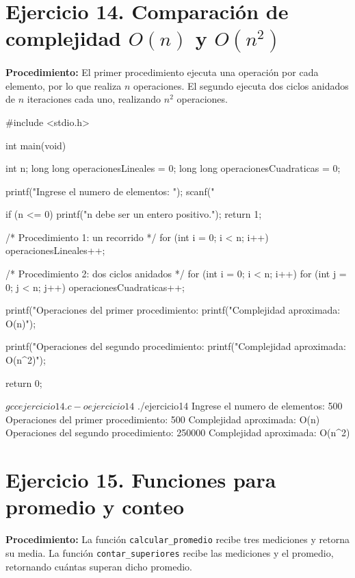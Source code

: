 \documentclass[11pt, a4paper]{article}
\begin{document}
\newpage

\section*{Ejercicio 14. Comparación de complejidad \texorpdfstring{$O(n)$}{O(n)} y \texorpdfstring{$O(n^2)$}{O(n^2)}}
\textbf{Procedimiento:} El primer procedimiento ejecuta una operación por cada elemento, por lo que realiza $n$ operaciones. El segundo ejecuta dos ciclos anidados de $n$ iteraciones cada uno, realizando $n^2$ operaciones.

\begin{codebox}[title={CÓDIGO FUENTE EN C: Ejercicio 14}]
#include <stdio.h>

int main(void) {
    int n;
    long long operacionesLineales = 0;
    long long operacionesCuadraticas = 0;

    printf("Ingrese el numero de elementos: ");
    scanf("%

    if (n <= 0) {
        printf("n debe ser un entero positivo.\n");
        return 1;
    }

    /* Procedimiento 1: un recorrido */
    for (int i = 0; i < n; i++) {
        operacionesLineales++;
    }

    /* Procedimiento 2: dos ciclos anidados */
    for (int i = 0; i < n; i++) {
        for (int j = 0; j < n; j++) {
            operacionesCuadraticas++;
        }
    }

    printf("Operaciones del primer procedimiento: %
    printf("Complejidad aproximada: O(n)\n");

    printf("Operaciones del segundo procedimiento: %
    printf("Complejidad aproximada: O(n^2)\n");

    return 0;
}
\end{codebox}

\begin{terminalout}
$ gcc ejercicio14.c -o ejercicio14
$ ./ejercicio14
Ingrese el numero de elementos: 500
Operaciones del primer procedimiento: 500
Complejidad aproximada: O(n)
Operaciones del segundo procedimiento: 250000
Complejidad aproximada: O(n^2)
\end{terminalout}

\newpage

\section*{Ejercicio 15. Funciones para promedio y conteo}
\textbf{Procedimiento:} La función \texttt{calcular\_promedio} recibe tres mediciones y retorna su media. La función \texttt{contar\_superiores} recibe las mediciones y el promedio, retornando cuántas superan dicho promedio.
\end{document}
